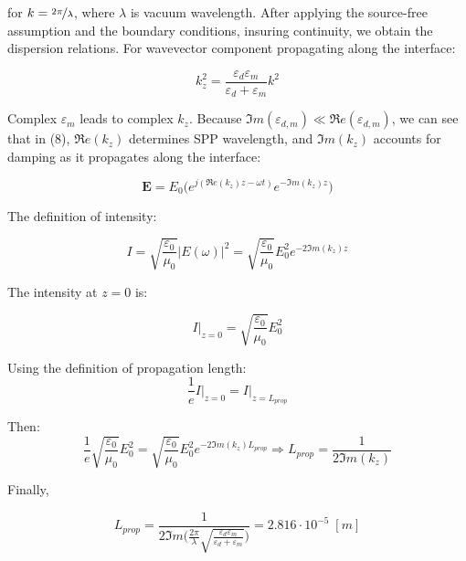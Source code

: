 \documentclass[11pt,a4paper]{article}
\begin{document}
for $k = \nicefrac{2 \pi}{\lambda}$, where $\lambda$ is vacuum wavelength. After applying the source-free assumption and the boundary conditions, insuring continuity, we obtain the dispersion relations. For wavevector component propagating along the interface: 

\begin{equation}
    k_z^2=\frac{\varepsilon_d \varepsilon_m}{\varepsilon_d + \varepsilon_m}k^2
\end{equation}

 Complex $\varepsilon_m$ leads to complex $k_z$. Because $\Im m (\varepsilon_{d,m}) \ll \Re e (\varepsilon_{d,m})$, we can see that in (8), $\Re e (k_z)$ determines SPP wavelength, and $\Im m (k_z)$ accounts for damping as it propagates along the interface:

 \begin{equation}
     \textbf{E}  = E_0 \big( e^{j (\Re e{(k_z)} z - \omega t)} e^{- \Im m{(k_z)} z}\big)
 \end{equation}

The definition of intensity:

\begin{equation}
    I = \sqrt{\frac{\varepsilon_0}{\mu_0}} |E(\omega)|^2 =\sqrt{\frac{\varepsilon_0}{\mu_0}} E_0^2 e^{-2 \Im m (k_z) z}
\end{equation}

The intensity at $z = 0$ is:

\begin{equation}
    I \big|_{z=0} = \sqrt{\frac{\varepsilon_0}{\mu_0}} E_0^2
\end{equation}

Using the definition of propagation length: 
\begin{equation}
    \frac{1}{e} I \big|_{z=0} =  I \big|_{z=L_{prop}}
\end{equation}

Then:
\begin{equation}
   \frac{1}{e} \sqrt{\frac{\varepsilon_0}{\mu_0}} E_0^2 = \sqrt{\frac{\varepsilon_0}{\mu_0}} E_0^2 e^{-2 \Im m (k_z) L_{prop}} \Rightarrow L_{prop}=\frac{1}{2 \Im m (k_z)}
\end{equation}

Finally,

\begin{equation}
    L_{prop}=\frac{1}{2 \Im m \big(\frac{2 \pi}{\lambda}\sqrt{\frac{\varepsilon_d \varepsilon_m}{\varepsilon_d + \varepsilon_m}}\big)} = 2.816 \cdot 10^{-5} \; [m]
\end{equation}
\end{document}
